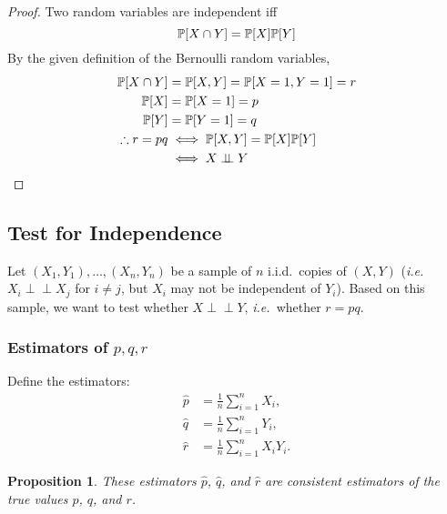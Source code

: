 \documentclass[letterpaper, reqno]{amsart}
\newtheorem{prop}{Proposition}[section]
\numberwithin{equation}{section}
\newcommand{\ie}{\emph{i.e.\ }}
\newcommand{\Prob}[1]{\mathbb{P}\mleft[#1\mright]}
\newcommand{\indep}{\perp \!\!\! \perp}  %
\newcommand{\iid}{i.i.d.}
\newcommand{\sumi}[2]{\sum_{#1=1}^{#2}}
\newcommand{\avg}[2]{\frac{1}{#2}\sumi{#1}{#2}}
\newcommand{\phat}{\hat{p}}
\newcommand{\qhat}{\hat{q}}
\newcommand{\rhat}{\hat{r}}
\begin{document}
\begin{proof}
  Two random variables are independent iff
  \begin{equation}
    \Prob{X \cap Y} = \Prob{X}\Prob{Y} \label{eq:indep}
  \end{equation}
  By the given definition of the Bernoulli random variables,
  \begin{align*}
    \Prob{X \cap Y} &= \Prob{X, Y} = \Prob{X=1, Y=1} = r \\
    \Prob{X} &= \Prob{X=1} = p \\
    \Prob{Y} &= \Prob{Y=1} = q \\
    \therefore r = pq &\iff \Prob{X,Y} = \Prob{X}\Prob{Y} \\
    &\iff X \indep Y  \qedhere
  \end{align*}
\end{proof}

\subsection{Test for Independence}
Let $(X_1, Y_1), \dots, (X_n, Y_n)$ be a sample of $n$ \iid\ copies of $(X, Y)$
(\ie $X_i \indep X_j$ for $i \ne j$, but $X_i$ may not be independent of $Y_i$).
Based on this sample, we want to test whether $X \indep Y$, \ie whether $r = pq$.

\subsubsection{Estimators of $p, q, r$}
Define the estimators:
\begin{align*}
  \phat &= \avg{i}{n} X_i, \\
  \qhat &= \avg{i}{n} Y_i, \\
  \rhat &= \avg{i}{n} X_i Y_i.
\end{align*}

\begin{prop}
  These estimators $\phat$, $\qhat$, and $\rhat$ are consistent estimators of
  the true values $p$, $q$, and $r$.
\end{prop}
\end{document}
